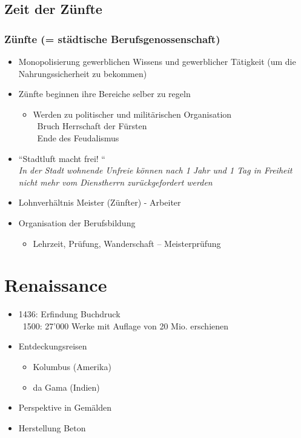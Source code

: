 \documentclass{report}
\begin{document}
\newpage

\subsection{Zeit der Zünfte}
\subsubsection{Zünfte \rm{(= städtische Berufsgenossenschaft)}}
\begin{itemize}
	\item Monopolisierung gewerblichen Wissens und gewerblicher Tätigkeit (um die Nahrungssicherheit zu bekommen)
	\item Zünfte beginnen ihre Bereiche selber zu regeln
		\begin{itemize}
			\item Werden zu politischer und militärischen Organisation\\
			\arrow~Bruch Herrschaft der Fürsten\\
			\arrow~Ende des Feudalismus
		\end{itemize}
	\item ``Stadtluft macht frei! ``\\
		\textit{In der Stadt wohnende Unfreie können nach 1 Jahr und 1 Tag in Freiheit nicht mehr vom Dienstherrn zurückgefordert werden}
	\item Lohnverhältnis Meister (Zünfter) - Arbeiter
	\item Organisation der Berufsbildung 
		\begin{itemize}
			\item Lehrzeit, Prüfung, Wanderschaft – Meisterprüfung
		\end{itemize}
\end{itemize}

\section{Renaissance}
\begin{itemize}
	\item 1436: Erfindung Buchdruck\\
	\arrow~1500: 27'000 Werke mit Auflage von 20 Mio. erschienen
	\item Entdeckungsreisen
		\begin{itemize}
			\item Kolumbus (Amerika)
			\item da Gama (Indien)
		\end{itemize}
	\item Perspektive in Gemälden
	\item Herstellung Beton
\end{itemize}
\end{document}
